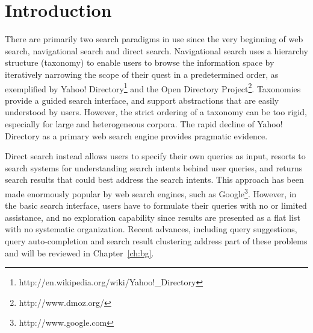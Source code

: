 \chapter{Introduction}
\label{ch:intro}


There are primarily two search paradigms in use since the very beginning of web search, navigational search and direct search. Navigational search uses a hierarchy structure (taxonomy) to enable users to browse the information space by iteratively narrowing the scope of their quest in a predetermined order, as exemplified by Yahoo! Directory\footnote{http://en.wikipedia.org/wiki/Yahoo!\_Directory} and the Open Directory Project\footnote{http://www.dmoz.org/}. Taxonomies provide a guided search interface, and support abstractions that are easily understood by users. However, the strict ordering of a taxonomy can be too rigid, especially for large and heterogeneous corpora. The rapid decline of Yahoo! Directory as a primary web search engine provides pragmatic evidence.

Direct search instead allows users to specify their own queries as input, resorts to search systems for understanding search intents behind user queries, and returns search results that could best address the search intents. This approach has been made enormously popular by web search engines, such as Google\footnote{http://www.google.com}. However, in the basic search interface, users have to formulate their queries with no or limited assistance, and no exploration capability since results are presented as a flat list with no systematic organization. Recent advances, including query suggestions, query auto-completion and search result clustering address part of these problems and will be reviewed in Chapter~\ref{ch:bg}.

